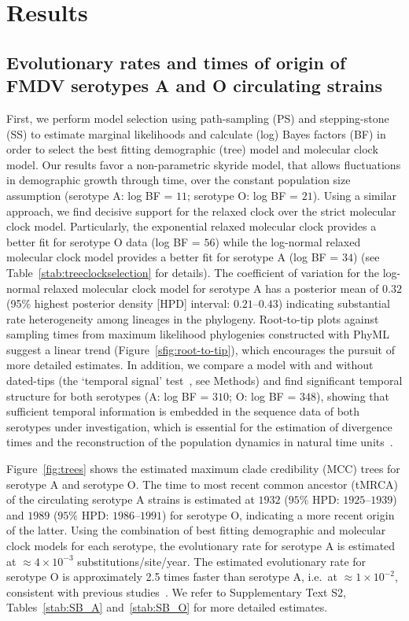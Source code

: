 \documentclass[10pt]{article}
\begin{document}
\section*{Results}

\subsection*{Evolutionary rates and times of origin of FMDV serotypes A and O circulating strains}

First, we perform model selection using path-sampling (PS) and stepping-stone (SS) to estimate marginal likelihoods and calculate (log) Bayes factors (BF) in order to select the best fitting demographic (tree) model and molecular clock model.
Our results favor a non-parametric skyride model, that allows fluctuations in demographic growth through time, over the constant population size assumption (serotype A: log BF = $11$; serotype O: log BF = $21$).
Using a similar approach, we  find decisive support for the relaxed clock over the strict molecular clock model.
Particularly, the exponential relaxed molecular clock provides a better fit for serotype O data (log BF = $56$) while the log-normal relaxed molecular clock model provides a better fit for serotype A (log BF = $34$) (see Table~\ref{stab:treeclockselection} for details). 
The coefficient of variation for the log-normal relaxed molecular clock model for serotype A has a posterior mean of $0.32$ (95\% highest posterior density [HPD] interval: $0.21$--$0.43$) indicating substantial rate heterogeneity among lineages in the phylogeny.
Root-to-tip plots against sampling times from maximum likelihood phylogenies constructed with PhyML~\cite{phyml} suggest a linear trend (Figure~\ref{sfig:root-to-tip}), which encourages the pursuit of more detailed estimates.
In addition, we compare a model with and without dated-tips (the `temporal signal' test~\cite{Faria2012, Baele2012}, see Methods) and find significant temporal structure for both serotypes (A: log BF = $310$; O: log BF = $348$), showing that sufficient temporal information is embedded in the sequence data of both serotypes under investigation, which is essential for the estimation of divergence times and the reconstruction of the population dynamics in natural time units~\cite{MEP}. 

Figure~\ref{fig:trees} shows the estimated maximum clade credibility (MCC) trees for serotype A and serotype O.
The time to most recent common ancestor (tMRCA) of the circulating serotype A strains is estimated at $1932$ ($95\%$ HPD: $1925$--$1939$) and  $1989$ ($95\%$ HPD: $ 1986$--$1991$) for serotype O, indicating a more recent origin of the latter. 
Using the combination of best fitting demographic and molecular clock models for each serotype, the evolutionary rate for serotype A is estimated at $\approx 4 \times 10^{-3}$ substitutions/site/year.
The estimated evolutionary rate for serotype O is approximately 2.5 times faster than serotype A, i.e.~at $\approx 1 \times 10^{-2}$, consistent with previous studies~\cite{tully, Carvalho2013, Muellner2011}.
We refer to Supplementary Text S2, Tables~\ref{stab:SB_A} and~\ref{stab:SB_O} for more detailed estimates.
\end{document}
